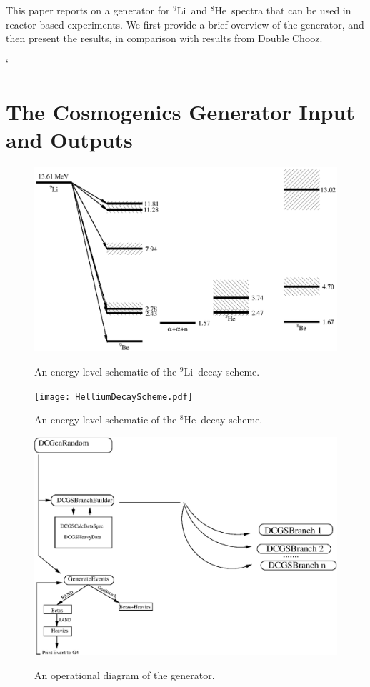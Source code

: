 \documentclass{JINST}
\newcommand{\li}{$^{9}$Li~}
\newcommand{\he}{$^{8}$He~}
\begin{document}
     This paper reports on a generator for \li and \he spectra that
     can be used in reactor-based experiments.   We first provide a
     brief overview of the generator, and then present the results, in
     comparison with results from Double Chooz.  
      
`
\section{The Cosmogenics Generator Input and Outputs}
\label{section1}

 \begin{figure}[t]
  \includegraphics[scale=0.65]{Lithium9DecayScheme.eps}
  \label{DecayScheme}
  \caption{An energy level schematic of the \li decay scheme. }
 \end{figure}


\begin{figure}[t]
  
  \texttt{[image: HelliumDecayScheme.pdf]}
  \label{he8_diagram}
  \caption{An energy level schematic of the \he decay scheme. }
  
\end{figure}


 \begin{figure}[t]
 \begin{center}
  \includegraphics[scale=0.65]{tmp_xfig.eps}
  \label{OperDiagram}
  \caption{An operational diagram of the generator. }
    \end{center}
 \end{figure}
\end{document}
